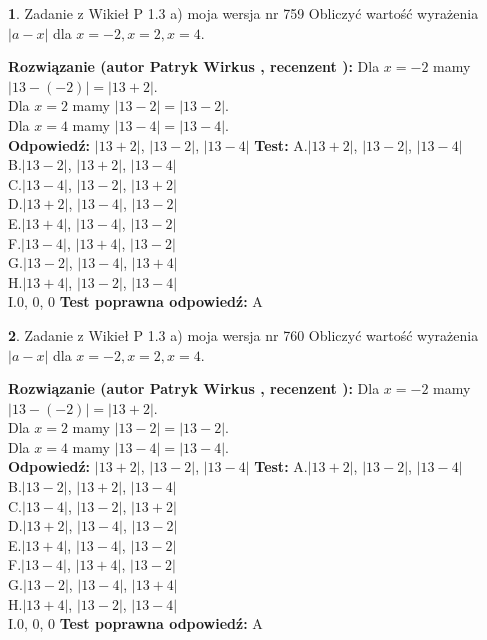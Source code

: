 \documentclass[12pt, a4paper]{article}
\theoremstyle{definition} %
\newtheorem{zad}{}
\newcommand{\zadStart}[1]{\begin{zad}#1\newline}
\newcommand{\zadStop}{\end{zad}}
\newcommand{\rozwStart}[2]{\noindent \textbf{Rozwiązanie (autor #1 , recenzent #2): }\newline}
\newcommand{\rozwStop}{\newline}
\newcommand{\odpStart}{\noindent \textbf{Odpowiedź:}\newline}
\newcommand{\odpStop}{\newline}
\newcommand{\testStart}{\noindent \textbf{Test:}\newline}
\newcommand{\testStop}{\newline}
\newcommand{\kluczStart}{\noindent \textbf{Test poprawna odpowiedź:}\newline}
\newcommand{\kluczStop}{\newline}
\begin{document}
\zadStart{Zadanie z Wikieł P 1.3 a) moja wersja nr 759}
Obliczyć wartość wyrażenia $|a - x|$ dla $x=-2,x=2,x=4$.
\zadStop
\rozwStart{Patryk Wirkus}{}
Dla $x = -2$ mamy $|13 - (-2)| = |13 + 2|$.\\
Dla $x = 2$ mamy $|13 - 2| = |13 - 2|$.\\
Dla $x = 4$ mamy $|13 - 4| = |13 - 4|$.\\
\rozwStop
\odpStart
$|13 + 2|$, $|13 - 2|$, $|13 - 4|$
\odpStop
\testStart
A.$|13 + 2|$, $|13 - 2|$, $|13 - 4|$\\
B.$|13 - 2|$, $|13 + 2|$, $|13 - 4|$\\
C.$|13 - 4|$, $|13 - 2|$, $|13 + 2|$\\
D.$|13 + 2|$, $|13 - 4|$, $|13 - 2|$\\
E.$|13 + 4|$, $|13 - 4|$, $|13 - 2|$\\
F.$|13 - 4|$, $|13 + 4|$, $|13 - 2|$\\
G.$|13 - 2|$, $|13 - 4|$, $|13 + 4|$\\
H.$|13 + 4|$, $|13 - 2|$, $|13 - 4|$\\
I.$0$, $0$, $0$
\testStop
\kluczStart
A
\kluczStop



\zadStart{Zadanie z Wikieł P 1.3 a) moja wersja nr 760}
Obliczyć wartość wyrażenia $|a - x|$ dla $x=-2,x=2,x=4$.
\zadStop
\rozwStart{Patryk Wirkus}{}
Dla $x = -2$ mamy $|13 - (-2)| = |13 + 2|$.\\
Dla $x = 2$ mamy $|13 - 2| = |13 - 2|$.\\
Dla $x = 4$ mamy $|13 - 4| = |13 - 4|$.\\
\rozwStop
\odpStart
$|13 + 2|$, $|13 - 2|$, $|13 - 4|$
\odpStop
\testStart
A.$|13 + 2|$, $|13 - 2|$, $|13 - 4|$\\
B.$|13 - 2|$, $|13 + 2|$, $|13 - 4|$\\
C.$|13 - 4|$, $|13 - 2|$, $|13 + 2|$\\
D.$|13 + 2|$, $|13 - 4|$, $|13 - 2|$\\
E.$|13 + 4|$, $|13 - 4|$, $|13 - 2|$\\
F.$|13 - 4|$, $|13 + 4|$, $|13 - 2|$\\
G.$|13 - 2|$, $|13 - 4|$, $|13 + 4|$\\
H.$|13 + 4|$, $|13 - 2|$, $|13 - 4|$\\
I.$0$, $0$, $0$
\testStop
\kluczStart
A
\kluczStop
\end{document}

